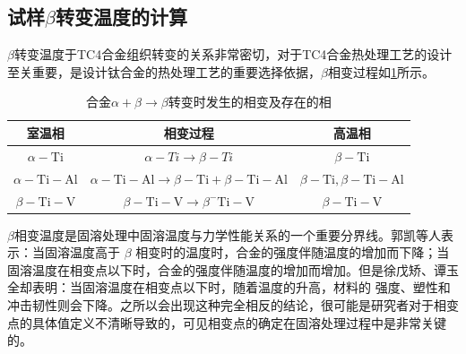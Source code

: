 %

\subsection{试样$\beta$转变温度的计算}
$\beta$转变温度于TC4合金组织转变的关系非常密切，对于TC4合金热处理工艺的设计至关重要，是设计钛合金的热处理工艺的重要选择依据，$ \beta $相变过程如\ref{sec:Tc4betachange}所示。

\begin{table}[htbp]
	\centering
	\caption{\ti 合金$ \alpha+\beta \to \beta $转变时发生的相变及存在的相}
	\label{sec:Tc4betachange}
	\begin{tabular}{ccc}
		\toprule 室温相 & 相变过程 & 高温相 \\
		\midrule$\alpha-\mathrm{Ti}$ & $\alpha-T i \rightarrow \beta-T i$ & $\beta-\mathrm{Ti}$ \\
		$\alpha-\mathrm{Ti}-\mathrm{Al}$ & $\alpha-\mathrm{Ti}-\mathrm{Al} \rightarrow \beta-\mathrm{Ti}+\beta-\mathrm{Ti}-\mathrm{Al}$ & $\beta-\mathrm{Ti}, \beta-\mathrm{Ti}-\mathrm{Al}$ \\
		$\beta- \mathrm{Ti}-\mathrm{V}$ & $\beta-\mathrm{Ti}-\mathrm{V} \rightarrow \beta^{-} \mathrm{Ti}-\mathrm{V}$ & $\beta-\mathrm{Ti}-\mathrm{V}$ \\
		\bottomrule
	\end{tabular}
\end{table}

$ \beta $相变温度是固溶处理中固溶温度与力学性能关系的一个重要分界线。郭凯\cite{guokaiTC4taihejinrechuligongyideyanjiuxianzhuangjijinzhan2021}等人表示：当固溶温度高于 $\beta$ 相变时的温度时，合金的强度伴随温度的增加而下降；当固溶温度在相变点以下时，合金的强度伴随温度的增加而增加。但是徐戊矫、谭玉全\cite{xujianGurongshixiaogongyiduiTC4taihejinzuzhijixingnengdeyingxiang2014}却表明：当固溶温度在相变点以下时，随着温度的升高，材料的 强度、塑性和冲击韧性则会下降。之所以会出现这种完全相反的结论，很可能是研究者对于相变点的具体值定义不清晰导致的，可见相变点的确定在固溶处理过程中是非常关键的。

